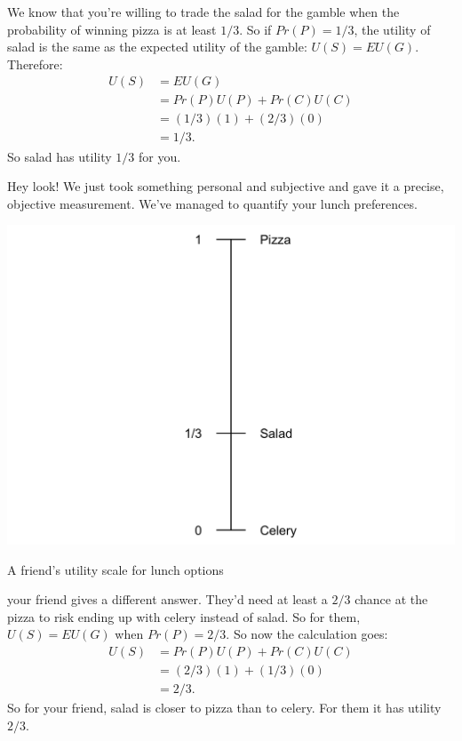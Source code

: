 \documentclass[justified]{tufte-book}
\renewcommand{\u}{U}
\newcommand{\p}{Pr}
\newcommand{\EU}{EU}
\theoremstyle{definition}
\theoremstyle{definition}
\theoremstyle{definition}
\theoremstyle{definition}
\theoremstyle{remark}
\begin{document}
We know that you're willing to trade the salad for the gamble when the probability of winning pizza is at least \(1/3\). So if \(\p(P) = 1/3\), the utility of salad is the same as the expected utility of the gamble: \(\u(S) = \EU(G)\). Therefore:
\[
  \begin{aligned}
    \u(S) &= \EU(G)\\
      &= \p(P)\u(P) + \p(C)\u(C)\\
      &= (1/3)(1) + (2/3)(0)\\
      &= 1/3.
  \end{aligned}
\]
So salad has utility \(1/3\) for you.

Hey look! We just took something personal and subjective and gave it a precise, objective measurement. We've managed to quantify your lunch preferences.

\begin{marginfigure}
\includegraphics{_main_files/figure-latex/unnamed-chunk-105-1} \caption[A friend's utility scale for lunch options]{A friend's utility scale for lunch options}\label{fig:unnamed-chunk-105}
\end{marginfigure}

 your friend gives a different answer. They'd need at least a \(2/3\) chance at the pizza to risk ending up with celery instead of salad. So for them, \(\u(S) = \EU(G)\) when \(\p(P) = 2/3\). So now the calculation goes:
\[
  \begin{aligned}
    \u(S) &= \p(P)\u(P) + \p(C)\u(C)\\
      &= (2/3)(1) + (1/3)(0)\\
      &= 2/3.
  \end{aligned}
\]
So for your friend, salad is closer to pizza than to celery. For them it has utility \(2/3\).
\end{document}
